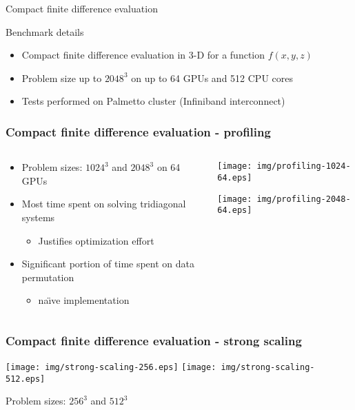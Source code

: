 \begin{frame}{Compact finite difference evaluation}
\footnotesize
\begin{block}{Benchmark details}
\begin{itemize}
\item Compact finite difference evaluation in 3-D for a function $f(x, y, z)$
\item Problem size up to $2048^3$ on up to 64 GPUs and 512 CPU cores
\item Tests performed on Palmetto cluster (Infiniband interconnect)
\end{itemize}
\end{block}
\end{frame}

\begin{frame}
\frametitle{Compact finite difference evaluation - profiling}
\begin{columns}
\begin{column}{0.5\textwidth}
\begin{itemize}
\item Problem sizes: $1024^3$ and $2048^3$ on 64 GPUs
\item Most time spent on solving tridiagonal systems
    \begin{itemize}
        \item Justifies optimization effort
    \end{itemize}
\item Significant portion of time spent on
    data permutation
    \begin{itemize}
        \item na\"{\i}ve implementation
    \end{itemize}
\end{itemize}
\end{column}
\begin{column}{0.5\textwidth}
\centering
\texttt{[image: img/profiling-1024-64.eps]}

\texttt{[image: img/profiling-2048-64.eps]}
\end{column}
\end{columns}
\end{frame}

\begin{frame}
\frametitle{Compact finite difference evaluation - strong scaling}
\centering
\texttt{[image: img/strong-scaling-256.eps]}
\texttt{[image: img/strong-scaling-512.eps]}

Problem sizes: $256^3$ and $512^3$
\end{frame}

